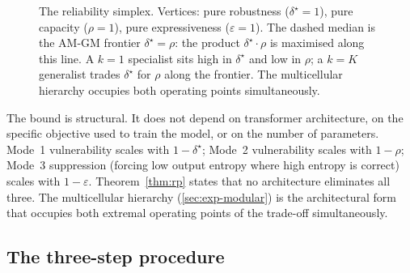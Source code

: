 \documentclass[11pt,a4paper]{article}
\begin{document}
\begin{figure}[H]
\centering
{}
\caption{The reliability simplex. Vertices: pure robustness ($\delta^\star = 1$), pure capacity ($\rho = 1$), pure expressiveness ($\varepsilon = 1$). The dashed median is the AM-GM frontier $\delta^\star = \rho$: the product $\delta^\star \cdot \rho$ is maximised along this line. A $k = 1$ specialist sits high in $\delta^\star$ and low in $\rho$; a $k = K$ generalist trades $\delta^\star$ for $\rho$ along the frontier. The multicellular hierarchy occupies both operating points simultaneously.}
\label{fig:simplex}
\end{figure}

The bound is structural. It does not depend on transformer architecture, on the specific objective used to train the model, or on the number of parameters. Mode~1 vulnerability scales with $1 - \delta^\star$; Mode~2 vulnerability scales with $1 - \rho$; Mode~3 suppression (forcing low output entropy where high entropy is correct) scales with $1 - \varepsilon$. Theorem~\ref{thm:rp} states that no architecture eliminates all three. The multicellular hierarchy (\ref{sec:exp-modular}) is the architectural form that occupies both extremal operating points of the trade-off simultaneously.


\subsection{The three-step procedure}
\label{sec:pipeline-procedure}
\end{document}
